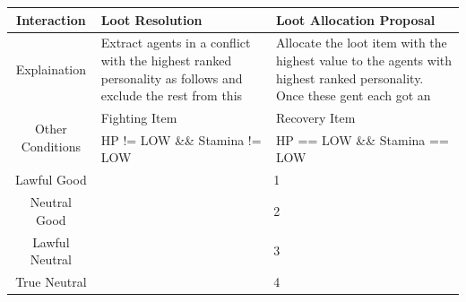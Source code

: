 \begin{table}[htb]
    \centering
    \small
    \begin{tabular}{ |c|p{16em}|p{16em}| }
        \hline
        Interaction                       & Loot Resolution                                                                                            & Loot Allocation Proposal                                                                                                 \\
        \hline
        Explaination                      & Extract agents in a conflict with the highest ranked personality as follows and exclude the rest from this & Allocate the loot item with the highest value to the agents with highest ranked personality. Once these gent each got an \\
        \hline
        \multirow{2}{*}{Other Conditions} & Fighting Item                                                                                              & Recovery Item                                                                                                            \\
        \cline{2-3}
                                          & HP != LOW \&\& Stamina != LOW                                                                              & HP == LOW \&\& Stamina == LOW                                                                                            \\
        \hline
        Lawful Good                       & \multicolumn{2}{c|}{1}                                                                                                                                                                                                                \\
        \hline
        Neutral Good                      & \multicolumn{2}{c|}{2}                                                                                                                                                                                                                \\
        \hline
        Lawful Neutral                    & \multicolumn{2}{c|}{3}                                                                                                                                                                                                                \\
        \hline
        True Neutral                      & \multicolumn{2}{c|}{4}                                                                                                                                                                                                                \\

\end{tabular}
\end{table}
